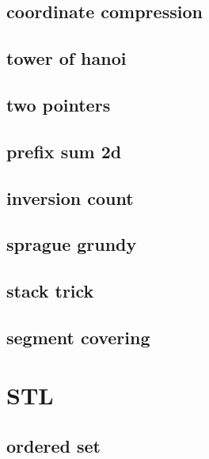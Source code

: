 \subsection{coordinate compression}
\raggedbottom
\hrulefill
\subsection{tower of hanoi}
\raggedbottom
\hrulefill
\subsection{two pointers}
\raggedbottom
\hrulefill
\subsection{prefix sum 2d}
\raggedbottom
\hrulefill
\subsection{inversion count}
\raggedbottom
\hrulefill
\subsection{sprague grundy}
\raggedbottom
\hrulefill
\subsection{stack trick}
\raggedbottom
\hrulefill
\subsection{segment covering}
\raggedbottom
\hrulefill

\section{STL}
\subsection{ordered set}
\raggedbottom
\hrulefill
